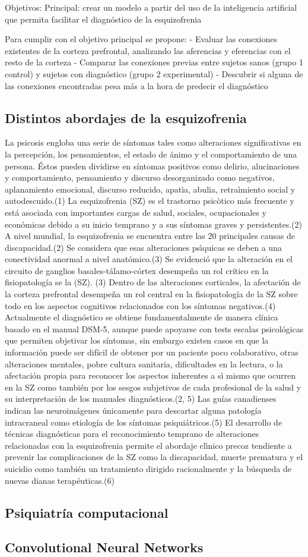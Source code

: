 Objetivos:
Principal: crear un modelo a partir del uso de la inteligencia artificial que permita facilitar el diagnóstico de la esquizofrenia 

Para cumplir con el objetivo principal se propone:
- Evaluar las conexiones existentes de la corteza prefrontal, analizando las aferencias y eferencias con el resto de la corteza
- Comparar las conexiones previas entre sujetos sanos (grupo 1 control) y sujetos con diagnóstico (grupo 2 experimental)
- Descubrir si alguna de las conexiones encontradas pesa más a la hora de predecir el diagnóstico
\subsection{Distintos abordajes de la esquizofrenia}
La psicosis engloba una serie de síntomas tales como alteraciones significativas en la percepción, los pensamientos, el estado de ánimo y el comportamiento de una persona. Éstos pueden dividirse en síntomas positivos como delirio, alucinaciones y comportamiento, pensamiento y discurso desorganizado como negativos, aplanamiento emocional, discurso reducido, apatìa, abulia, retraìmiento social y autodescuido.(1)
La esquizofrenia (SZ)  es el trastorno psicòtico más frecuente y está asociada con importantes cargas de salud, sociales, ocupacionales y económicas debido a su inicio temprano y a sus síntomas graves y persistentes.(2)
A nivel mundial, la esquizofrenia se encuentra entre las 20 principales causas de discapacidad.(2)
Se considera que esas alteraciones psìquicas se deben a una conectividad anormal a nivel anatómico.(3)
Se evidenció que la alteración en el circuito de ganglios basales-tálamo-córtex desempeña un rol crítico en la fisiopatología se la (SZ). (3)
Dentro de las alteraciones corticales, la afectación de la corteza prefrontal desempeña un rol central en la fisiopatología de la SZ sobre todo en los aspectos cognitivos relacionados con los síntomas negativos.(4) Actualmente el diagnóstico se obtiene fundamentalmente de manera clínica basado en el manual DSM-5, aunque puede apoyarse con tests escalas psicológicas que permiten objetivar los síntomas, sin embargo existen casos en que la información puede ser difícil de obtener por un paciente poco colaborativo, otras alteraciones mentales, pobre cultura sanitaria, dificultades en la lectura, o la afectación propia para reconocer los aspectos inherentes a sì mismo que ocurren en la SZ como también por los sesgos subjetivos de cada profesional de la salud y su interpretación de los manuales diagnósticos.(2, 5) 
Las guías canadienses indican las neuroimágenes únicamente para descartar alguna patología intracraneal como etiología de los síntomas psiquiátricos.(5)
El desarrollo de técnicas diagnósticas para el reconocimiento temprano de alteraciones relacionadas con la esquizofrenia permite el abordaje clìnico precoz tendiente a prevenir las complicaciones de la SZ como la discapacidad, muerte prematura y el suicidio como también un tratamiento dirigido racionalmente y la búsqueda de nuevas dianas terapéuticas.(6)

\subsection{Psiquiatría computacional}

\subsection{Convolutional Neural Networks}
